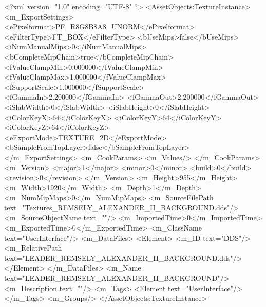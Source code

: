 <?xml version="1.0" encoding="UTF-8" ?>
<AssetObjects:TextureInstance>
	<m_ExportSettings>
		<ePixelformat>PF_R8G8B8A8_UNORM</ePixelformat>
		<eFilterType>FT_BOX</eFilterType>
		<bUseMips>false</bUseMips>
		<iNumManualMips>0</iNumManualMips>
		<bCompleteMipChain>true</bCompleteMipChain>
		<fValueClampMin>0.000000</fValueClampMin>
		<fValueClampMax>1.000000</fValueClampMax>
		<fSupportScale>1.000000</fSupportScale>
		<fGammaIn>2.200000</fGammaIn>
		<fGammaOut>2.200000</fGammaOut>
		<iSlabWidth>0</iSlabWidth>
		<iSlabHeight>0</iSlabHeight>
		<iColorKeyX>64</iColorKeyX>
		<iColorKeyY>64</iColorKeyY>
		<iColorKeyZ>64</iColorKeyZ>
		<eExportMode>TEXTURE_2D</eExportMode>
		<bSampleFromTopLayer>false</bSampleFromTopLayer>
	</m_ExportSettings>
	<m_CookParams>
		<m_Values/>
	</m_CookParams>
	<m_Version>
		<major>1</major>
		<minor>0</minor>
		<build>0</build>
		<revision>0</revision>
	</m_Version>
	<m_Height>955</m_Height>
	<m_Width>1920</m_Width>
	<m_Depth>1</m_Depth>
	<m_NumMipMaps>0</m_NumMipMaps>
	<m_SourceFilePath text="Textures\LEADER_REMSELY_ALEXANDER_II_BACKGROUND.dds"/>
	<m_SourceObjectName text=""/>
	<m_ImportedTime>0</m_ImportedTime>
	<m_ExportedTime>0</m_ExportedTime>
	<m_ClassName text="UserInterface"/>
	<m_DataFiles>
		<Element>
			<m_ID text="DDS"/>
			<m_RelativePath text="LEADER_REMSELY_ALEXANDER_II_BACKGROUND.dds"/>
		</Element>
	</m_DataFiles>
	<m_Name text="LEADER_REMSELY_ALEXANDER_II_BACKGROUND"/>
	<m_Description text=""/>
	<m_Tags>
		<Element text="UserInterface"/>
	</m_Tags>
	<m_Groups/>
</AssetObjects:TextureInstance>
